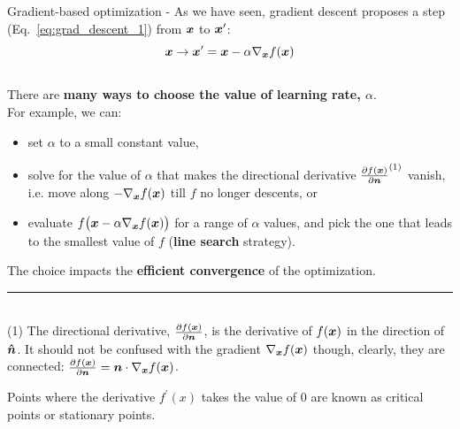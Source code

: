\begin{frame}[t,allowframebreaks]{Gradient-based optimization -}
    As we have seen, 
    \gls{gradient descent} 
    proposes a step (Eq.~\ref{eq:grad_descent_1}) from $\boldsymbol{x}$ to $\boldsymbol{x}^\prime$:
    \begin{equation*}
        \boldsymbol{x} \rightarrow \boldsymbol{x}^\prime = 
            \boldsymbol{x} - \alpha \nabla_{\boldsymbol{x}} f(\boldsymbol{x})
    \end{equation*}\\
    \vspace{-0.1cm}
    There are {\bf many ways to choose the 
    value of  \gls{learning rate}, $\alpha$}.\\
    \vspace{0.2cm}
    For example, we can:
    \begin{itemize}
        \item 
          set $\alpha$ to a small constant value,
        \item 
          solve for the value of $\alpha$ that makes the 
          directional derivative $\frac{\partial f(\boldsymbol{x})}{\partial \boldsymbol{n}}^{(1)}$ 
          vanish, i.e. move along $-\nabla_{\boldsymbol{x}} f(\boldsymbol{x})$
          till $f$ no longer descents, or
        \item 
          evaluate $f\big(\boldsymbol{x} - \alpha \nabla_{\boldsymbol{x}} f(\boldsymbol{x})\big)$
          for a range of $\alpha$ values, and  pick the one that leads to the smallest
          value of $f$ ({\bf line search} strategy).
    \end{itemize}
    \vspace{0.2cm}
    The choice impacts the {\bf efficient convergence} of the optimization.\\
    \noindent\rule{4cm}{0.4pt}\\
    \vspace{0.1cm}
    {\tiny
    (1) The directional derivative, 
    $\frac{\partial f(\boldsymbol{x})}{\partial \boldsymbol{n}}$,
    is the derivative of $f(\boldsymbol{x})$ in the direction of $\boldsymbol{\hat{n}}$. 
    It should not be confused with the gradient 
    $\nabla_{\boldsymbol{x}} f(\boldsymbol{x})$ though,
    clearly, they are connected: 
    $\frac{\partial f(\boldsymbol{x})}{\partial \boldsymbol{n}} = 
     \boldsymbol{n} \cdot \nabla_{\boldsymbol{x}} f(\boldsymbol{x})$.\\
    }


    \framebreak


    Points where the 
    \gls{derivative} $f^\prime(x)$ 
    takes the value of 0  are known as 
    \glspl{critical point} or 
    \glspl{stationary point}.\\


\end{frame}
